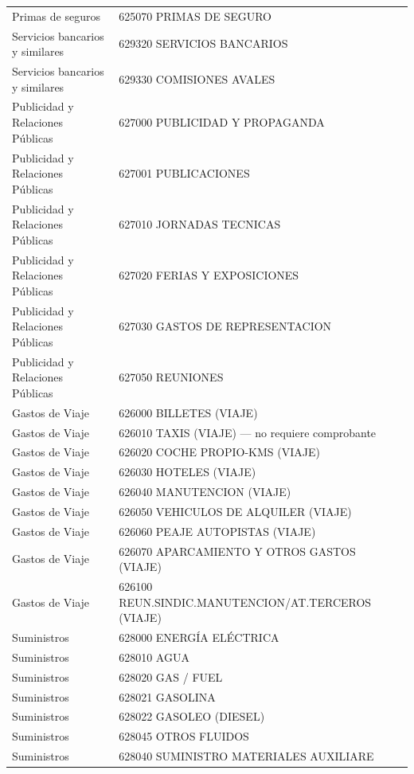 \documentclass[11pt,letterpaper]{article}
\begin{document}
\begin{xltabular}{\textwidth}{L{5.2cm} Y}
Primas de seguros & 625070 PRIMAS DE SEGURO \\
 Servicios bancarios y similares & 629320 SERVICIOS BANCARIOS \\
Servicios bancarios y similares & 629330 COMISIONES AVALES \\
 Publicidad y Relaciones Públicas & 627000 PUBLICIDAD Y PROPAGANDA \\
Publicidad y Relaciones Públicas & 627001 PUBLICACIONES \\
 Publicidad y Relaciones Públicas & 627010 JORNADAS TECNICAS \\
Publicidad y Relaciones Públicas & 627020 FERIAS Y EXPOSICIONES \\
 Publicidad y Relaciones Públicas & 627030 GASTOS DE REPRESENTACION \\
Publicidad y Relaciones Públicas & 627050 REUNIONES \\
 Gastos de Viaje & 626000 BILLETES (VIAJE) \\
Gastos de Viaje & 626010 TAXIS (VIAJE) --- no requiere comprobante \\
 Gastos de Viaje & 626020 COCHE PROPIO-KMS (VIAJE) \\
Gastos de Viaje & 626030 HOTELES (VIAJE) \\
 Gastos de Viaje & 626040 MANUTENCION (VIAJE) \\
Gastos de Viaje & 626050 VEHICULOS DE ALQUILER (VIAJE) \\
 Gastos de Viaje & 626060 PEAJE AUTOPISTAS (VIAJE) \\
Gastos de Viaje & 626070 APARCAMIENTO Y OTROS GASTOS (VIAJE) \\
 Gastos de Viaje & 626100 REUN.SINDIC.MANUTENCION/AT.TERCEROS (VIAJE) \\
Suministros & 628000 ENERGÍA ELÉCTRICA \\
 Suministros & 628010 AGUA \\
Suministros & 628020 GAS / FUEL \\
 Suministros & 628021 GASOLINA \\
Suministros & 628022 GASOLEO (DIESEL) \\
 Suministros & 628045 OTROS FLUIDOS \\
Suministros & 628040 SUMINISTRO MATERIALES AUXILIARE \\

\end{xltabular}
\end{document}
